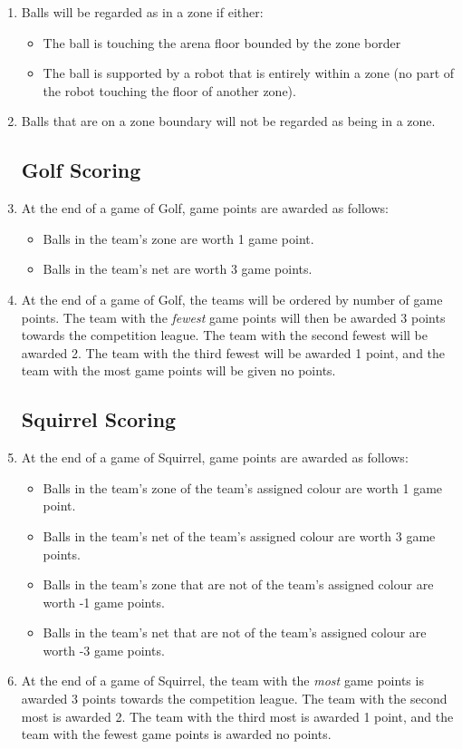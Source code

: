 \begin{enumerate}
\item Balls will be regarded as in a zone if either:
  \begin{itemize}
  \item The ball is touching the arena floor bounded by the zone border
    \item The ball is supported by a robot that is entirely within a zone (no part of the robot touching the floor of another zone).
  \end{itemize}

\item Balls that are on a zone boundary will not be regarded as being in a zone.

\subsection{Golf Scoring}
\item At the end of a game of Golf, game points are awarded as follows:
\begin{itemize}
\item Balls in the team's zone are worth 1 game point.
\item Balls in the team's net are worth 3 game points.
\end{itemize}

\item At the end of a game of Golf, the teams will be ordered by number of game points.  The team with the \emph{fewest} game points will then be awarded 3 points towards the competition league.  The team with the second fewest will be awarded 2.  The team with the third fewest will be awarded 1 point, and the team with the most game points will be given no points.

\subsection{Squirrel Scoring}
\item At the end of a game of Squirrel, game points are awarded as follows:
\begin{itemize}
\item Balls in the team's zone of the team's assigned colour are worth 1 game point.
\item Balls in the team's net of the team's assigned colour are worth 3 game points.
\item Balls in the team's zone that are not of the team's assigned colour are worth -1 game points.
\item Balls in the team's net that are not of the team's assigned colour are worth -3 game points.
\end{itemize}

\item At the end of a game of Squirrel, the team with the \emph{most} game points is awarded 3 points towards the competition league.  The team with the second most is awarded 2.  The team with the third most is awarded 1 point, and the team with the fewest game points is awarded no points.

\end{enumerate}
